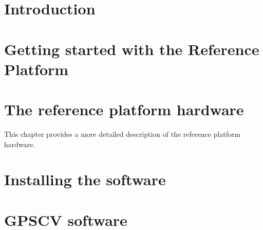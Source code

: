 \documentclass[11pt,a4paper,openany,oneside]{book}
\begin{document}
\tableofcontents
\listoffigures
\listoftables

\lstset{
	xleftmargin=24pt,
	basewidth=0.5em,
	basicstyle=\ttfamily,
	escapechar=\%
}

\chapter{Introduction}



\chapter{Getting started with the Reference Platform}



\chapter{The reference platform hardware}

This chapter provides a more detailed description of the reference platform hardware.





\chapter{Installing the software}


\chapter{GPSCV software}
\end{document}
